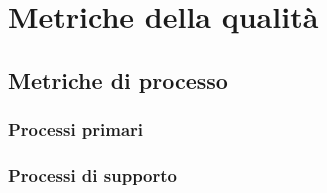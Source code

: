 \section{Metriche della qualità}
\subsection{Metriche di processo}
\subsubsection{Processi primari}
\subsubsection{Processi di supporto}